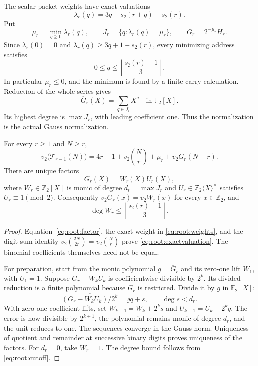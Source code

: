 The scalar packet weights have exact valuations
\[
 \lambda_r(q)=3q+s_2(r+q)-s_2(r).
\]
Put
\[
 \mu_r=\min_{q\ge0}\lambda_r(q),\qquad
 J_r=\{q:\lambda_r(q)=\mu_r\},\qquad G_r=2^{-\mu_r}H_r.
\]
Since $\lambda_r(0)=0$ and
$\lambda_r(q)\ge3q+1-s_2(r)$, every minimizing address satisfies
\begin{equation}
 0\le q\le\left\lfloor\frac{s_2(r)-1}{3}\right\rfloor.
 \label{eq:root:cutoff}
\end{equation}
In particular $\mu_r\le0$, and the minimum is found by a finite carry
calculation. Reduction of the whole series gives
\begin{equation}
 \overline G_r(X)=\sum_{q\in J_r}X^{\underline q}
       \quad\text{in }\mathbb F_2[X].
 \label{eq:root:reduction}
\end{equation}
Its highest degree is $\max J_r$, with leading coefficient one.
Thus the normalization is the actual Gauss normalization.

\begin{theorem}
For every $r\ge1$ and $N\ge r$,
\begin{equation}
 v_2\bigl(\mathcal T_{r-1}(N)\bigr)
 =4r-1+v_2\binom Nr+\mu_r+v_2G_r(N-r).
 \label{eq:root:exactvaluation}
\end{equation}
There are unique factors
\[
 G_r(X)=W_r(X)U_r(X),
\]
where $W_r\in\mathbb Z_2[X]$ is monic of degree $d_r=\max J_r$ and
$U_r\in\mathbb Z_2\langle X\rangle^\times$ satisfies $U_r\equiv1\pmod2$.
Consequently $v_2G_r(x)=v_2W_r(x)$ for every $x\in\mathbb Z_2$, and
\[
 \deg W_r\le\left\lfloor\frac{s_2(r)-1}{3}\right\rfloor.
\]
\label{thm:root:finitepreparation}
\end{theorem}
\begin{proof}
Equation~\eqref{eq:root:factor}, the exact weight in
\eqref{eq:root:weights}, and the digit-sum identity
$v_2\binom{2N}{2r}=v_2\binom Nr$ prove
\eqref{eq:root:exactvaluation}. The binomial coefficients themselves
need not be equal.

For preparation, start from the monic polynomial
$g=\overline G_r$ and its zero-one lift $W_1$, with $U_1=1$.
Suppose $G_r-W_kU_k$ is coefficientwise divisible by $2^k$.
Its divided reduction is a finite polynomial because $G_r$ is restricted.
Divide it by $g$ in $\mathbb F_2[X]$:
\[
 \overline{(G_r-W_kU_k)/2^k}=gq+s,\qquad\deg s<d_r.
\]
With zero-one coefficient lifts, set
$W_{k+1}=W_k+2^ks$ and $U_{k+1}=U_k+2^kq$.
The error is now divisible by $2^{k+1}$, the polynomial remains monic of
degree $d_r$, and the unit reduces to one. The sequences converge in the
Gauss norm. Uniqueness of quotient and remainder at successive binary
digits proves uniqueness of the factors. For $d_r=0$, take $W_r=1$.
The degree bound follows from \eqref{eq:root:cutoff}.
\end{proof}

